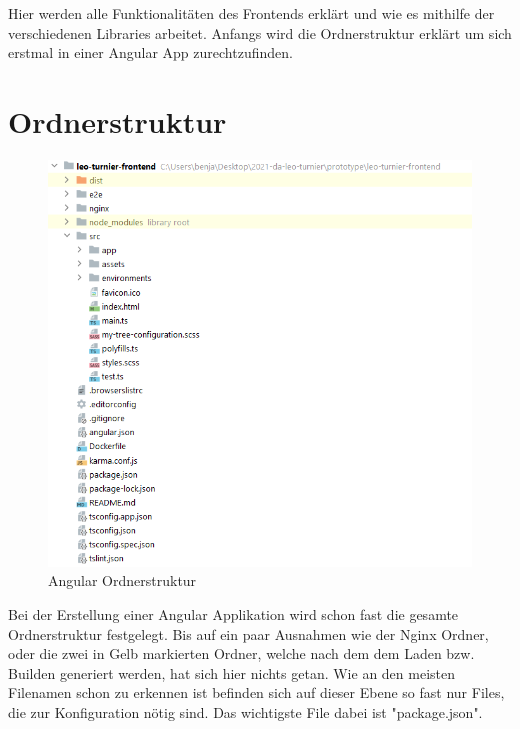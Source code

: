 
Hier werden alle Funktionalitäten des Frontends erklärt und wie es mithilfe der verschiedenen Libraries arbeitet.  Anfangs wird die Ordnerstruktur erklärt um sich erstmal in einer Angular App zurechtzufinden.

\section{Ordnerstruktur}
\begin{figure}[H]
    \includegraphics[scale=0.8]{pics/frontend/angular_file_structure.PNG}
    \caption{Angular Ordnerstruktur}
\end{figure}

Bei der Erstellung einer Angular Applikation wird schon fast die gesamte Ordnerstruktur festgelegt. Bis auf ein paar Ausnahmen wie der Nginx Ordner, oder die zwei in Gelb markierten Ordner,
welche nach dem dem Laden bzw. Builden generiert werden, hat sich hier nichts getan.
Wie an den meisten Filenamen schon zu erkennen ist befinden sich auf dieser Ebene so fast nur Files, die zur Konfiguration nötig sind. Das wichtigste File dabei ist "package.json".

